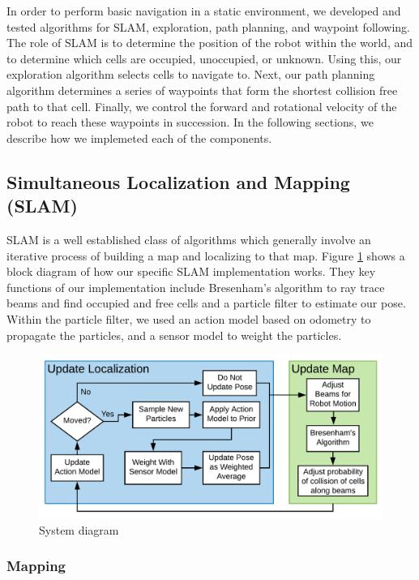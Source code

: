\documentclass[journal]{IEEEtran}
\begin{document}
    In order to perform basic navigation in a static environment, we developed and tested algorithms for SLAM, exploration, path planning, and waypoint following. The role of SLAM is to determine the position of the robot within the world, and to determine which cells are occupied, unoccupied, or unknown. Using this, our exploration algorithm selects cells to navigate to. Next, our path planning algorithm determines a series of waypoints that form the shortest collision free path to that cell. Finally, we control the forward and rotational velocity of the robot to reach these waypoints in succession. In the following sections, we describe how we implemeted each of the components.
    
    \subsection{Simultaneous Localization and Mapping (SLAM)}
    
        SLAM is a well established class of algorithms which generally involve an iterative process of building a map and localizing to that map. Figure \ref{fig:sys} shows a block diagram of how our specific SLAM implementation works. They key functions of our implementation include Bresenham's algorithm to ray trace beams and find occupied and free cells and a particle filter to estimate our pose. Within the particle filter, we used an action model based on odometry to propagate the particles, and a sensor model to weight the particles.
        
        \begin{figure}[b]
            \centering
            \includegraphics[width=1\linewidth]{slam.pdf}
            \caption{System diagram}
            \label{fig:sys}
        \end{figure}
    
        \subsubsection{Mapping}
        
\end{document}
